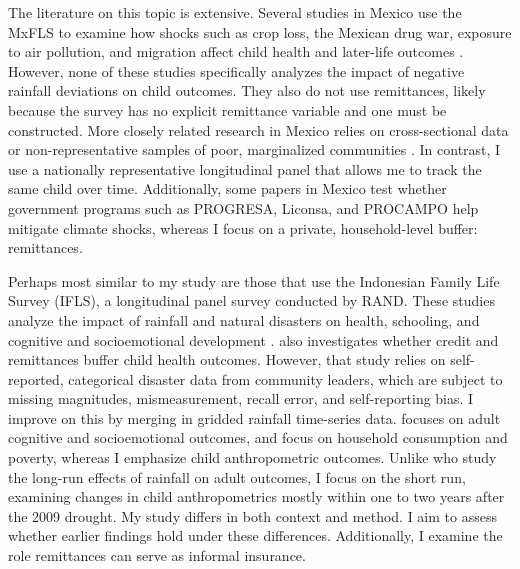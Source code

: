 \documentclass[12pt]{article}
\begin{document}
The literature on this topic is extensive. Several studies in Mexico use the MxFLS to examine how shocks such as crop loss, the Mexican drug war, exposure to air pollution, and migration affect child health and later-life outcomes \parencite{michaelsenChildrenRiskEffect2012,brownMexicanDrugWar2018,molinaPollutionAbilityGenderSpecific2021,damonChildhoodObesityMexico2014}. However, none of these studies specifically analyzes the impact of negative rainfall deviations on child outcomes. They also do not use remittances, likely because the survey has no explicit remittance variable and one must be constructed. More closely related research in Mexico relies on cross-sectional data or non-representative samples of poor, marginalized communities \parencite{agueroLongTermEffectClimate2014,skoufiasClimateVariabilityChild2012,adhvaryuHelpingChildrenCatch2024,aguilarNinoChildrenMediumterm2022}. In contrast, I use a nationally representative longitudinal panel that allows me to track the same child over time. Additionally, some papers in Mexico test whether government programs such as PROGRESA, Liconsa, and PROCAMPO help mitigate climate shocks, whereas I focus on a private, household-level buffer: remittances.

Perhaps most similar to my study are those that use the Indonesian Family Life Survey (IFLS), a longitudinal panel survey conducted by RAND. These studies analyze the impact of rainfall and natural disasters on health, schooling, and cognitive and socioemotional development \parencite{webbCriticalPeriodsCognitive2024,macciniWeatherHealthSchooling2009,thamarapaniNaturalDisastersChild2021}. \textcite{thamarapaniNaturalDisastersChild2021} also investigates whether credit and remittances buffer child health outcomes. However, that study relies on self-reported, categorical disaster data from community leaders, which are subject to missing magnitudes, mismeasurement, recall error, and self-reporting bias. I improve on this by merging in gridded rainfall time-series data. \textcite{webbCriticalPeriodsCognitive2024} focuses on adult cognitive and socioemotional outcomes, and \textcite{adamsEconomicImpactInternational2010} focus on household consumption and poverty, whereas I emphasize child anthropometric outcomes. Unlike \textcite{macciniWeatherHealthSchooling2009} who study the long-run effects of rainfall on adult outcomes, I focus on the short run, examining changes in child anthropometrics mostly within one to two years after the 2009 drought. My study differs in both context and method. I aim to assess whether earlier findings hold under these differences. Additionally, I examine the role remittances can serve as informal insurance.
\end{document}
